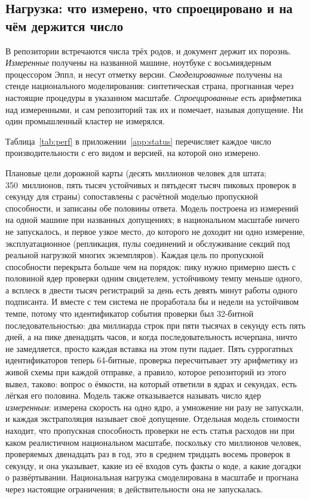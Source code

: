 \subsection{Нагрузка: что измерено, что спроецировано и на чём держится число}

В репозитории встречаются числа трёх родов, и документ держит их порознь. \emph{Измеренные}
получены на названной машине, ноутбуке с восьмиядерным процессором Эппл, и несут отметку версии.
\emph{Смоделированные} получены на стенде национального моделирования: синтетическая страна,
прогнанная через настоящие процедуры в указанном масштабе. \emph{Спроецированные} есть арифметика
над измеренными, и сам репозиторий так их и помечает, называя допущение. Ни один промышленный
кластер не измерялся.

Таблица~\ref{tab:perf} в приложении~\ref{app:status} перечисляет каждое число производительности с его
видом и версией, на которой оно измерено.


Плановые цели дорожной карты (десять миллионов человек для штата; 350~миллионов, пять тысяч
устойчивых и пятьдесят тысяч пиковых проверок в секунду для страны) сопоставлены с расчётной моделью пропускной способности, и
записаны обе половины ответа. Модель построена из измерений на одной машине при названных допущениях;
в национальном масштабе ничего не запускалось, и первое узкое место, до которого не доходит ни одно
измерение, эксплуатационное (репликация, пулы соединений и обслуживание секций под реальной
нагрузкой многих экземпляров). Каждая цель по пропускной способности перекрыта больше чем на
порядок: пику нужно примерно шесть с половиной ядер проверки одним свидетелем, устойчивому темпу
меньше одного, а всплеск в двести тысяч регистраций за день есть девять минут работы одного
подписанта. И вместе с тем система не проработала бы и недели на устойчивом темпе, потому что
идентификатор события проверки был 32-битной последовательностью: два миллиарда строк при пяти
тысячах в секунду есть пять дней, а на пике двенадцать часов, и когда последовательность
исчерпана, ничто не замедляется, просто каждая вставка на этом пути падает. Пять суррогатных
идентификаторов теперь 64-битные, проверка пересчитывает эту арифметику из живой схемы при
каждой отправке, а правило, которое репозиторий из этого вывел, таково: вопрос о ёмкости, на
который ответили в ядрах и секундах, есть лёгкая его половина. Модель также отказывается называть
число ядер \emph{измеренным}: измерена скорость на одно ядро, а умножение ни разу не запускали, и
каждая экстраполяция называет своё допущение. Отдельная модель стоимости
находит, что пропускная способность проверки не есть статья расходов ни при каком реалистичном
национальном масштабе, поскольку сто миллионов человек, проверяемых двенадцать раз в год, это
в среднем тридцать восемь проверок в секунду, и она указывает, какие из её входов суть факты о
коде, а какие догадки о развёртывании. Национальная нагрузка смоделирована в масштабе и прогнана
через настоящие ограничения; в действительности она не запускалась. \sExp

